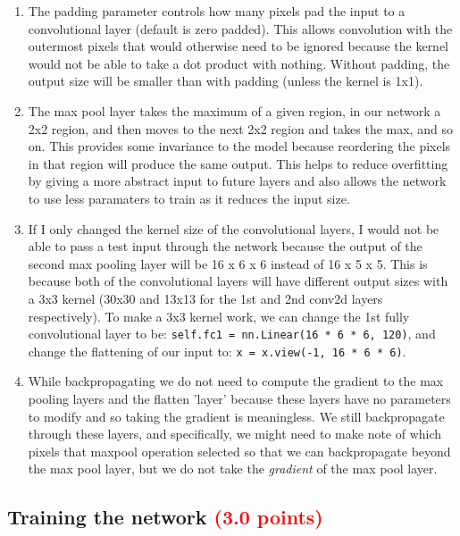 \documentclass[answers]{exam}
\newcommand{\mypoints}[1]{\textcolor{red}{(#1 points)}}
\begin{document}
\begin{solution}
\begin{enumerate}
    
    \item The padding parameter controls how many pixels pad the input to a convolutional layer (default is zero padded). This allows convolution with the outermost pixels that would otherwise need to be 
    ignored because the kernel would not be able to take a dot product with nothing. Without padding, the output size will be smaller than with padding (unless the kernel is 1x1).
    
    \item The max pool layer takes the maximum of a given region, in our network a 2x2 region, and then moves to the next 2x2 region and takes the max, and so on. This provides some invariance to the model because reordering the pixels in that region will produce the same output. This helps to reduce overfitting by giving a more abstract input to future layers and also allows the network to use less paramaters to train as it reduces the input size.
    
    \item If I only changed the kernel size of the convolutional layers, I would not be able to pass a test input through the network because the output of the second max pooling layer will be 16 x 6 x 6 instead of 16 x 5 x 5. This is because both of the convolutional layers will have different output sizes with a 3x3 kernel (30x30 and 13x13 for the 1st and 2nd conv2d layers respectively). To make a 3x3 kernel work, we can change the 1st fully convolutional layer to be: \texttt{self.fc1 = nn.Linear(16 * 6 * 6, 120)}, and change the flattening of our input to: \texttt{x = x.view(-1, 16 * 6 * 6)}.
    
    \item While backpropagating we do not need to compute the gradient to the max pooling layers and the flatten 'layer' because these layers have no parameters to modify and so taking the gradient is meaningless. We still backpropagate through these layers, and specifically, we might need to make note of which pixels that maxpool operation selected so that we can backpropagate beyond the max pool layer, but we do not take the \textit{gradient} of the max pool layer.
    \end{enumerate}
\end{solution}

\subsection{Training the network \mypoints{3.0}}
\end{document}
